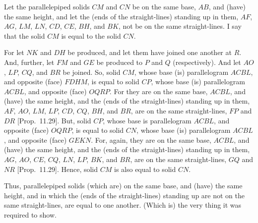 \begin{Parallel}{}{}
{Let the parallelepiped solids $CM$ and $CN$ be on the same base, $AB$,
and (have) the same height, and let the (ends of the straight-lines)
standing up in them, $AF$, $AG$, $LM$, $LN$, $CD$, $CE$, $BH$,
and $BK$, not be on the same straight-lines. I say that the solid $CM$
is equal to the solid $CN$.

For let $NK$ and $DH$ be produced, and let them have joined
one another at $R$. And, further, let $FM$ and $GE$ be produced
to $P$ and $Q$ (respectively). And let $AO$, $LP$, $CQ$, and
$BR$ be joined. So, solid $CM$, whose base (is)
parallelogram $ACBL$, and opposite (face) $FDHM$, is equal to solid
$CP$, whose base (is) parallelogram $ACBL$, and opposite
(face) $OQRP$. For they are on the same base, $ACBL$, and (have) the
same height, and the (ends of the straight-lines) standing up in them,
$AF$, $AO$, $LM$, $LP$, $CD$, $CQ$, $BH$, and $BR$, are on the
same straight-lines, $FP$ and $DR$ [Prop.~11.29]. 
But,  solid $CP$, whose base is parallelogram
$ACBL$, and opposite (face) $OQRP$, is equal to solid
$CN$, whose base (is) parallelogram $ACBL$, and opposite (face)
$GEKN$. For, again, they are on the same base, $ACBL$,
and (have) the same height, and the (ends of the straight-lines) standing up
in them, $AG$, $AO$, $CE$, $CQ$, $LN$, $LP$, $BK$, and $BR$,
are on the same straight-lines, $GQ$ and $NR$ [Prop.~11.29]. Hence, solid $CM$ is also equal to solid $CN$.

Thus, parallelepiped solids (which are) on the same base,
and (have) the same height, and in which the (ends of the straight-lines)
standing up are not on the same straight-lines, are equal to one another.
(Which is) the very thing it was required to show.}
\end{Parallel}

